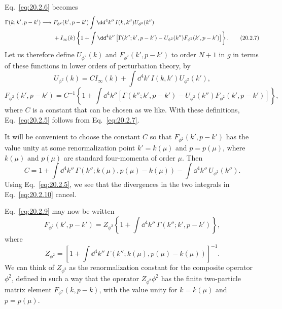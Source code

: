 Eq.~\eqref{eq:20.2.6} becomes
\begin{align}
 \Gamma(k;k',p-k')\longrightarrow{}&
 F_{\phi^2}(k',p-k')
 \int \dd^4k''\,I(k,k'')U_{\phi^2}(k'')
 \notag\\
 &+I_\infty(k)
 \left\{1+\int \dd^4k''
 \left[\Gamma(k'';k',p-k')
 -U_{\phi^2}(k'')F_{\phi^2}(k',p-k')\right]\right\}.
 \tag{20.2.7}\label{eq:20.2.7}
\end{align}
Let us therefore define $U_{\phi^2}(k)$ and $F_{\phi^2}(k',p-k')$ to order
$N+1$ in $g$ in terms of these functions in lower orders of perturbation
theory, by
\begin{equation}
 U_{\phi^2}(k)=CI_\infty(k)
 +\int \dd^4k'\,I(k,k')U_{\phi^2}(k'),
 \tag{20.2.8}\label{eq:20.2.8}
\end{equation}
\begin{equation}
 F_{\phi^2}(k',p-k')=C^{-1}
 \left\{1+\int \dd^4k''
 \left[\Gamma(k'';k',p-k')
 -U_{\phi^2}(k'')F_{\phi^2}(k',p-k')\right]\right\},
 \tag{20.2.9}\label{eq:20.2.9}
\end{equation}
where $C$ is a constant that can be chosen as we like. With these definitions,
Eq.~\eqref{eq:20.2.5} follows from Eq.~\eqref{eq:20.2.7}.

It will be convenient to choose the constant $C$ so that
$F_{\phi^2}(k',p-k')$ has the value unity at some renormalization point
$k'=k(\mu)$ and $p=p(\mu)$, where $k(\mu)$ and $p(\mu)$ are standard
four-momenta of order $\mu$. Then
\begin{equation}
 C=1+\int \dd^4k''\,\Gamma(k'';k(\mu),p(\mu)-k(\mu))
 -\int \dd^4k''\,U_{\phi^2}(k'').
 \tag{20.2.10}\label{eq:20.2.10}
\end{equation}
Using Eq.~\eqref{eq:20.2.5}, we see that the divergences in the two integrals
in Eq.~\eqref{eq:20.2.10} cancel.

Eq.~\eqref{eq:20.2.9} may now be written
\begin{equation}
 F_{\phi^2}(k',p-k')=
 Z_{\phi^2}\left\{1+\int \dd^4k''\,\Gamma(k'';k',p-k')\right\},
 \tag{20.2.11}\label{eq:20.2.11}
\end{equation}
where
\begin{equation}
 Z_{\phi^2}=
 \left[1+\int \dd^4k''\,
 \Gamma(k'';k(\mu),p(\mu)-k(\mu))\right]^{-1}.
 \tag{20.2.12}\label{eq:20.2.12}
\end{equation}
We can think of $Z_{\phi^2}$ as the renormalization constant for the
composite operator $\phi^2$, defined in such a way that the operator
$Z_{\phi^2}\phi^2$ has the finite two-particle matrix element
$F_{\phi^2}(k,p-k)$, with the value unity for $k=k(\mu)$ and $p=p(\mu)$.

